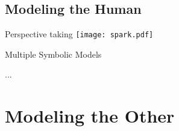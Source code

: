 \documentclass[compress]{beamer}
\begin{document}

\subsection{Modeling the Human}


\begin{frame}{Perspective taking}
        \centering
        \texttt{[image: spark.pdf]}
        \vspace*{1em}

\end{frame}


{
\begin{frame}{Multiple Symbolic Models}
        \begin{multicols}{2}
            \begin{figure}
                \resizebox{0.35\textwidth}{!}{\usebox{\ontoinstance}}
            \end{figure}
            \begin{figure}
                \resizebox{0.35\textwidth}{!}{\usebox{\ontoinstance}}
            \end{figure}
            \begin{figure}
                \resizebox{0.35\textwidth}{!}{\usebox{\ontoinstance}}
            \end{figure}
            {\vspace*{1.5cm}\hspace*{2.5cm}\huge...}
        \end{multicols}
\end{frame}
}




\section{Modeling the Other}

\end{document}
